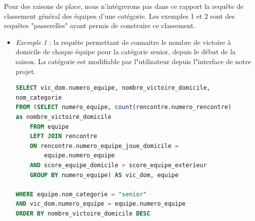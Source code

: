 \documentclass[a4paper,12pt]{article}
\begin{document}
Pour des raisons de place, nous n'intégrerons pas dans ce rapport la requête de classement général des équipes d'une catégorie. Les exemples 1 et 2 sont des requêtes "passerelles" ayant permis de construire ce classement.
\\
\begin{itemize}
\item \textit{Exemple 1} : la requête permettant de connaitre le nombre de victoire à domicile de chaque équipe pour la catégorie senior, depuis le début de la saison. La catégorie est modifiable par l"utilisateur depuis l"interface de notre projet.
\begin{lstlisting}[language=SQL, caption=Victoire à domicile, frame=shadowbox]
SELECT vic_dom.numero_equipe, nombre_victoire_domicile,
nom_categorie
FROM (SELECT numero_equipe, count(rencontre.numero_rencontre)
as nombre_victoire_domicile
    FROM equipe
    LEFT JOIN rencontre
    ON rencontre.numero_equipe_joue_domicile = 
    	equipe.numero_equipe
    AND score_equipe_domicile > score_equipe_exterieur
    GROUP BY numero_equipe) AS vic_dom, equipe

WHERE equipe.nom_categorie = "senior"
AND vic_dom.numero_equipe = equipe.numero_equipe
ORDER BY nombre_victoire_domicile DESC
\end{lstlisting}


\end{itemize}
\end{document}
